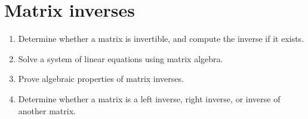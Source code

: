 \section{Matrix inverses}

\begin{outcome}
  \begin{enumerate}
  \item Determine whether a matrix is invertible, and compute the
    inverse if it exists.
  \item Solve a system of linear equations using matrix algebra.
  \item Prove algebraic properties of matrix inverses.
  \item Determine whether a matrix is a left inverse, right inverse, or
    inverse of another matrix.
  \end{enumerate}
\end{outcome}

